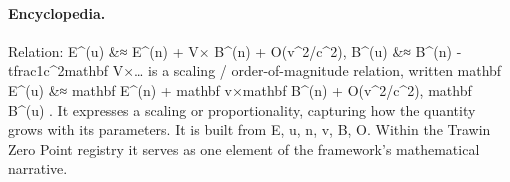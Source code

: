 \paragraph{Encyclopedia.}
Relation: E\textasciicircum{}(u) \&≈ E\textasciicircum{}(n) + V× B\textasciicircum{}(n) + O(v\textasciicircum{}2/c\textasciicircum{}2), B\textasciicircum{}(u) \&≈ B\textasciicircum{}(n) - tfrac1c\textasciicircum{}2mathbf V×… is a scaling / order-of-magnitude relation, written mathbf E\textasciicircum{}(u) \&≈ mathbf E\textasciicircum{}(n) + mathbf v×mathbf B\textasciicircum{}(n) + O(v\textasciicircum{}2/c\textasciicircum{}2), mathbf B\textasciicircum{}(u) . It expresses a scaling or proportionality, capturing how the quantity grows with its parameters. It is built from E, u, n, v, B, O. Within the Trawin Zero Point registry it serves as one element of the framework's mathematical narrative.
